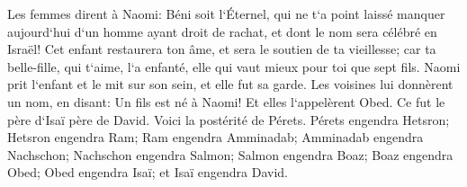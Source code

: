 \verse Les femmes dirent à Naomi: Béni soit l`Éternel, qui ne t`a point laissé manquer aujourd`hui d`un homme ayant droit de rachat, et dont le nom sera célébré en Israël! 
\verse Cet enfant restaurera ton âme, et sera le soutien de ta vieillesse; car ta belle-fille, qui t`aime, l`a enfanté, elle qui vaut mieux pour toi que sept fils. 
\verse Naomi prit l`enfant et le mit sur son sein, et elle fut sa garde. 
\verse Les voisines lui donnèrent un nom, en disant: Un fils est né à Naomi! Et elles l`appelèrent Obed. Ce fut le père d`Isaï père de David. 
\verse Voici la postérité de Pérets. 
\verse Pérets engendra Hetsron; Hetsron engendra Ram; Ram engendra Amminadab; 
\verse Amminadab engendra Nachschon; Nachschon engendra Salmon; 
\verse Salmon engendra Boaz; Boaz engendra Obed; 
\verse Obed engendra Isaï; et Isaï engendra David. 
